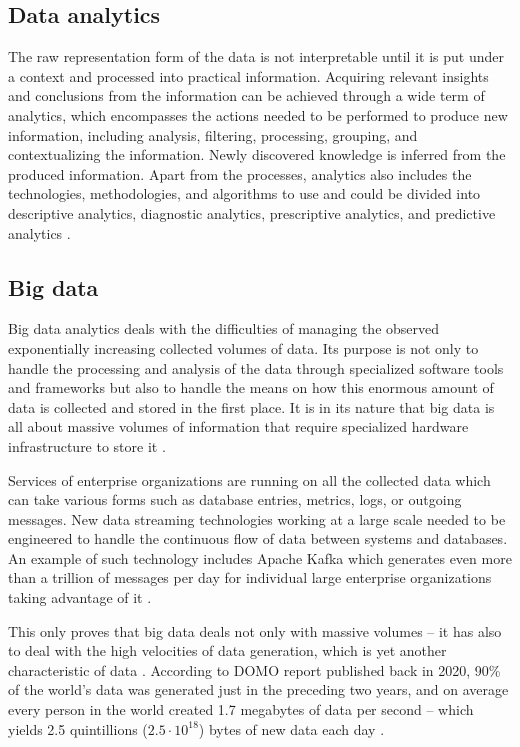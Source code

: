 \documentclass[a4paper,twoside,12pt]{book}
\begin{document}
\subsection{Data analytics}
The raw representation form of the data is not interpretable until it is put under a context and processed into practical information.
Acquiring relevant insights and conclusions from the information can be achieved through a wide term of analytics, which encompasses the actions needed to be performed to produce new information, including analysis, filtering, processing, grouping, and contextualizing the information. Newly discovered knowledge is inferred from the produced information.
Apart from the processes, analytics also includes the technologies, methodologies, and algorithms to use and could be divided into descriptive analytics, diagnostic analytics, prescriptive analytics, and predictive analytics \cite{bib:big_data_analytics}.

\subsection{Big data}

Big data analytics deals with the difficulties of managing the observed exponentially increasing collected volumes of data. Its purpose is not only to handle the processing and analysis of the data through specialized software tools and frameworks but also to handle the means on how this enormous amount of data is collected and stored in the first place. It is in its nature that big data is all about massive volumes of information that require specialized hardware infrastructure to store it \cite{bib:big_data_analytics}.

Services of enterprise organizations are running on all the collected data which can take various forms such as database entries, metrics, logs, or outgoing messages. New data streaming technologies working at a large scale needed to be engineered to handle the continuous flow of data between systems and databases. An example of such technology includes Apache Kafka which generates even more than a trillion of messages per day for individual large enterprise organizations taking advantage of it \cite{bib:kafka_online,bib:kafka}.

This only proves that big data deals not only with massive volumes – it has also to deal with the high velocities of data generation, which is yet another characteristic of data \cite{bib:big_data_analytics}. According to DOMO report published back in 2020, 90\% of the world's data was generated just in the preceding two years, and on average every person in the world created 1.7 megabytes of data per second – which yields 2.5 quintillions ($2.5 \cdot 10^{18}$) bytes of new data each day \cite{bib:domo}.
\end{document}
